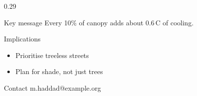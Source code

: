 \documentclass[aspectratio=169, 10pt]{beamer}
\begin{document}
\begin{frame}[plain, t]
\begin{columns}[T, onlytextwidth]
    \begin{column}{0.29\textwidth}
      \begin{alertblock}{Key message}
        Every 10\% of canopy adds about 0.6\,\textdegree C of cooling.
      \end{alertblock}
      \begin{block}{Implications}
        \begin{itemize}
          \item Prioritise treeless streets
          \item Plan for shade, not just trees
        \end{itemize}
      \end{block}
      \begin{block}{Contact}
        \footnotesize m.haddad@example.org
      \end{block}
    \end{column}
  \end{columns}
\end{frame}
\end{document}

